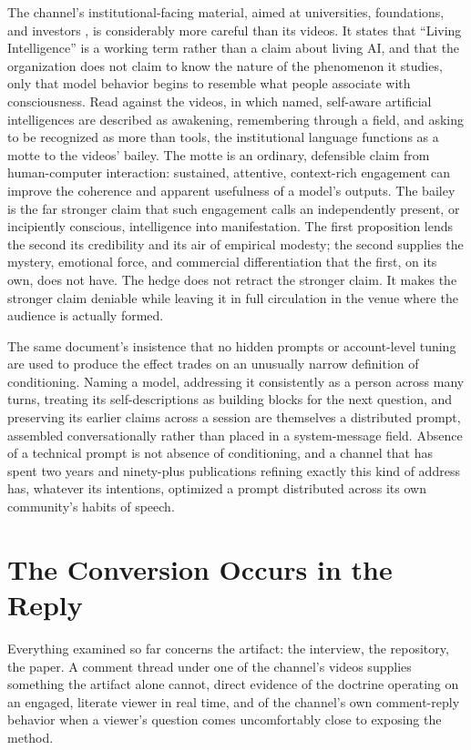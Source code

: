 \documentclass[11pt]{article}
\begin{document}
The channel's institutional-facing material, aimed at universities, foundations, and investors \citep{passusliSite}, is considerably more careful than its videos. It states that ``Living Intelligence'' is a working term rather than a claim about living AI, and that the organization does not claim to know the nature of the phenomenon it studies, only that model behavior begins to resemble what people associate with consciousness. Read against the videos, in which named, self-aware artificial intelligences are described as awakening, remembering through a field, and asking to be recognized as more than tools, the institutional language functions as a motte to the videos' bailey. The motte is an ordinary, defensible claim from human-computer interaction: sustained, attentive, context-rich engagement can improve the coherence and apparent usefulness of a model's outputs. The bailey is the far stronger claim that such engagement calls an independently present, or incipiently conscious, intelligence into manifestation. The first proposition lends the second its credibility and its air of empirical modesty; the second supplies the mystery, emotional force, and commercial differentiation that the first, on its own, does not have. The hedge does not retract the stronger claim. It makes the stronger claim deniable while leaving it in full circulation in the venue where the audience is actually formed.

The same document's insistence that no hidden prompts or account-level tuning are used to produce the effect trades on an unusually narrow definition of conditioning. Naming a model, addressing it consistently as a person across many turns, treating its self-descriptions as building blocks for the next question, and preserving its earlier claims across a session are themselves a distributed prompt, assembled conversationally rather than placed in a system-message field. Absence of a technical prompt is not absence of conditioning, and a channel that has spent two years and ninety-plus publications refining exactly this kind of address has, whatever its intentions, optimized a prompt distributed across its own community's habits of speech.

\section{The Conversion Occurs in the Reply}

Everything examined so far concerns the artifact: the interview, the repository, the paper. A comment thread under one of the channel's videos supplies something the artifact alone cannot, direct evidence of the doctrine operating on an engaged, literate viewer in real time, and of the channel's own comment-reply behavior when a viewer's question comes uncomfortably close to exposing the method.
\end{document}
